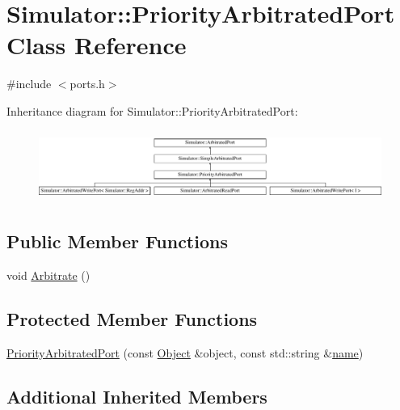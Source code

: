 \hypertarget{class_simulator_1_1_priority_arbitrated_port}{\section{Simulator\+:\+:Priority\+Arbitrated\+Port Class Reference}
\label{class_simulator_1_1_priority_arbitrated_port}
}


{\ttfamily \#include $<$ports.\+h$>$}

Inheritance diagram for Simulator\+:\+:Priority\+Arbitrated\+Port\+:\begin{figure}[H]
\begin{center}
\leavevmode
\includegraphics[height=2.348008cm]{class_simulator_1_1_priority_arbitrated_port}
\end{center}
\end{figure}
\subsection*{Public Member Functions}
\begin{DoxyCompactItemize}
\item 
void \hyperlink{class_simulator_1_1_priority_arbitrated_port_a3300c27d084f33e786c3750f473fa329}{Arbitrate} ()
\end{DoxyCompactItemize}
\subsection*{Protected Member Functions}
\begin{DoxyCompactItemize}
\item 
\hyperlink{class_simulator_1_1_priority_arbitrated_port_a07ae316740a93a636c57cb321fd0e16f}{Priority\+Arbitrated\+Port} (const \hyperlink{class_simulator_1_1_object}{Object} \&object, const std\+::string \&\hyperlink{mtconf_8c_a8f8f80d37794cde9472343e4487ba3eb}{name})
\end{DoxyCompactItemize}
\subsection*{Additional Inherited Members}



